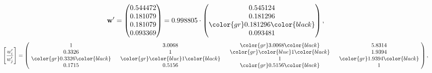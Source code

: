 \begin{example}
\begin{equation*}
\mathbf{w}^{\prime} =
\begin{pmatrix}
0.544472\\
0.181079\\
0.181079\\
0.093369
\end{pmatrix} =
0.998805\cdot
\begin{pmatrix}
0.545124\\
0.181296\\
\color{gr} 0.181296\color{black} \\
0.093481
\end{pmatrix},
\end{equation*}
\begin{equation*}
\left[ \frac{{w}^{\prime}_i}{{w}^{\prime}_j} \right] =
\begin{pmatrix}
$\,\,$ 1 $\,\,$ & $\,\,$3.0068$\,\,$ & $\,\,$\color{gr} 3.0068\color{black} $\,\,$ & $\,\,$5.8314$\,\,$ \\
$\,\,$0.3326$\,\,$ & $\,\,$ 1 $\,\,$ & $\,\,$\color{gr} \color{blue} 1\color{black} $\,\,$ & $\,\,$1.9394  $\,\,$ \\
$\,\,$\color{gr} 0.3326\color{black} $\,\,$ & $\,\,$\color{gr} \color{blue} 1\color{black} $\,\,$ & $\,\,$ 1 $\,\,$ & $\,\,$\color{gr} 1.9394\color{black}  $\,\,$ \\
$\,\,$0.1715$\,\,$ & $\,\,$0.5156$\,\,$ & $\,\,$\color{gr} 0.5156\color{black} $\,\,$ & $\,\,$ 1  $\,\,$ \\
\end{pmatrix},
\end{equation*}
\end{example}
\newpage
